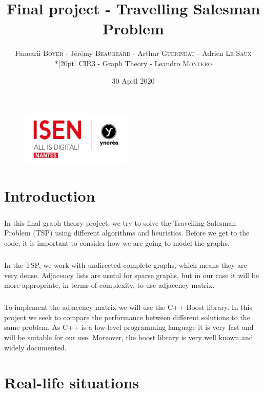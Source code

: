 \documentclass[a4paper, 12pt]{report}
\title{Final project - Travelling Salesman Problem}
\author{Fanoarii \textsc{Boyer} - Jérémy \textsc{Beaugeard} - Arthur \textsc{Guerineau} - Adrien \textsc{Le Saux} \\*[20pt] CIR3 - Graph Theory - Leandro \textsc{Montero}}
\date{30 April 2020}
\begin{document}
	\begin{titlepage}
		\begin{figure}
			\begin{center}
				\includegraphics[width=150pt]{isen.png}
				\maketitle
			\end{center}
		\end{figure}
	\end{titlepage}

	\tableofcontents
	
	\chapter{Introduction}
	\paragraph{}
	In this final graph theory project, we try to solve the Travelling Salesman Problem (TSP) using different algorithms and heuristics.
	Before we get to the code, it is important to consider how we are going to model the graphs.
	\paragraph{}
	In the TSP, we work with undirected complete graphs, which means they are very dense. Adjacency lists are useful for sparse graphs, but in our case it will be more appropriate, in terms of complexity, to use adjacency matrix\cite{complexity}.
	\paragraph{}
	To implement the adjacency matrix\cite{adjacency_matrix} we will use the C++ Boost\cite{boost} library. In this project we seek to compare the performance between different solutions to the same problem. As C++ is a low-level programming language it is very fast and will be suitable for our use. Moreover, the boost library is very well known and widely documented.
	
	\chapter{Real-life situations}
	
\end{document}
